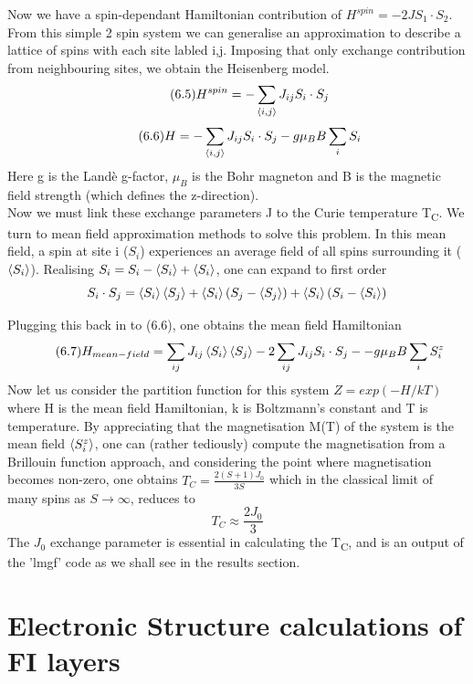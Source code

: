 \documentclass[12pt]{article}
\begin{document}
Now we have a spin-dependant Hamiltonian contribution of $H^{spin}=-2JS_1\cdot S_2$. From this simple 2 spin system we can generalise an approximation to describe a lattice of spins with each site labled i,j. Imposing that only exchange contribution from neighbouring sites, we obtain the Heisenberg model.
\begin{equation} \label{4.1} \tag{6.5}
H^{spin}=-\sum_{\expval{i,j}}J_{ij}S_i \cdot S_j
\end{equation}
\begin{equation} \label{4.1} \tag{6.6}
H=-\sum_{\expval{i,j}}J_{ij}S_i \cdot S_j-g\mu_BB\sum_iS_i
\end{equation}
Here g is the Landè g-factor, $\mu_B$ is the Bohr magneton and B is the magnetic field strength (which defines the z-direction). 
\\
Now we must link these exchange parameters J to the Curie temperature T\textsubscript{C}. We turn to mean field approximation methods to solve this problem. In this mean field, a spin at site i ($S_i$) experiences an average field of all spins surrounding it ($\expval{S_i}$). Realising $S_i=S_i-\expval{S_i}+\expval{S_i}$, one can expand to first order
$$S_i\cdot S_j=\expval{S_i}\expval{S_j}+\expval{S_i}(S_j-\expval{S_j}) + \expval{S_i}(S_i-\expval{S_i})$$

Plugging this back in to (6.6), one obtains the mean field Hamiltonian
\begin{equation} \label{4.1} \tag{6.7}
H_{mean-field}=\sum_{ij}J_{ij}\expval{S_i}\expval{S_j}-2\sum_{ij}J_{ij}S_i\cdot S_j--g\mu_BB\sum_iS^z_i
\end{equation}
Now let us consider the partition function for this system $Z=exp(-H/kT)$ where H is the mean field Hamiltonian, k is Boltzmann's constant and T is temperature. By appreciating that the magnetisation M(T) of the system is the mean field $\expval{S^z_i}$, one can (rather tediously) compute the magnetisation from a Brillouin function approach, and considering the point where magnetisation becomes non-zero, one obtains $T_C=\frac{2(S+1)J_0}{3S}$ which in the classical limit of many spins as $S\rightarrow \infty $, reduces to
\begin{equation} \label{4.1} \tag{6.8}
T_C\approx\frac{2J_0}{3}
\end{equation}
The $J_0$ exchange parameter is essential in calculating the T\textsubscript{C}, and is an output of the 'lmgf' code as we shall see in the results section.

\section{Electronic Structure calculations of FI layers}
\end{document}
